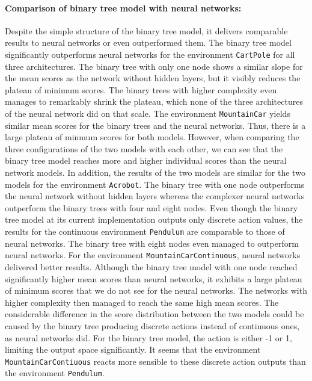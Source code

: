 \paragraph*{Comparison of binary tree model with neural networks:} Despite the simple structure of the binary tree model, it delivers comparable results to neural networks or even outperformed them. The binary tree model significantly outperforms neural networks for the environment \verb|CartPole| for all three architectures. The binary tree with only one node shows a similar slope for the mean scores as the network without hidden layers, but it visibly reduces the plateau of minimum scores. The binary trees with higher complexity even manages to remarkably shrink the plateau, which none of the three architectures of the neural network did on that scale. The environment \verb|MountainCar| yields similar mean scores for the binary trees and the neural networks. Thus, there is a large plateau of minmum scores for both models. However, when comparing the three configurations of the two models with each other, we can see that the binary tree model reaches more and higher individual scores than the neural network models. In addition, the results of the two models are similar for the two models for the environment \verb|Acrobot|. The binary tree with one node outperforms the neural network without hidden layers whereas the complexer neural networks outperform the binary trees with four and eight nodes. Even though the binary tree model at its current implementation outputs only discrete action values, the results for the continuous environment \verb|Pendulum| are comparable to those of neural networks. The binary tree with eight nodes even managed to outperform neural networks. For the environment \verb|MountainCarContinuous|, neural networks delivered better results. Although the binary tree model with one node reached significantly higher mean scores than neural networks, it exhibits a large plateau of minimum scores that we do not see for the neural networks. The networks with higher complexity then managed to reach the same high mean scores. The considerable difference in the score distribution between the two models could be caused by the binary tree producing discrete actions instead of continuous ones, as neural networks did. For the binary tree model, the action is either -1 or 1, limiting the output space significantly. It seems that the environment \verb|MountainCarContiuous| reacts more sensible to these discrete action outputs than the environment \verb|Pendulum|.

